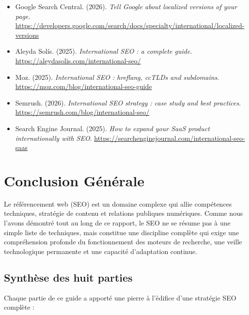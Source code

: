 \documentclass[12pt,a4paper,twoside]{report}
\begin{document}
\begin{itemize}
    \item Google Search Central. (2026). \textit{Tell Google about localized versions of your page}. \url{https://developers.google.com/search/docs/specialty/international/localized-versions}
    \item Aleyda Solís. (2025). \textit{International SEO : a complete guide}. \url{https://aleydasolis.com/international-seo/}
    \item Moz. (2025). \textit{International SEO : hreflang, ccTLDs and subdomains}. \url{https://moz.com/blog/international-seo-guide}
    \item Semrush. (2026). \textit{International SEO strategy : case study and best practices}. \url{https://semrush.com/blog/international-seo/}
    \item Search Engine Journal. (2025). \textit{How to expand your SaaS product internationally with SEO}. \url{https://searchenginejournal.com/international-seo-saas}
\end{itemize}


\chapter*{Conclusion Générale}

\onehalfspacing

Le référencement web (SEO) est un domaine complexe qui allie compétences techniques, stratégie de contenu et relations publiques numériques. Comme nous l'avons démontré tout au long de ce rapport, le SEO ne se résume pas à une simple liste de techniques, mais constitue une discipline complète qui exige une compréhension profonde du fonctionnement des moteurs de recherche, une veille technologique permanente et une capacité d'adaptation continue.

\section*{Synthèse des huit parties}

Chaque partie de ce guide a apporté une pierre à l'édifice d'une stratégie SEO complète :
\end{document}
